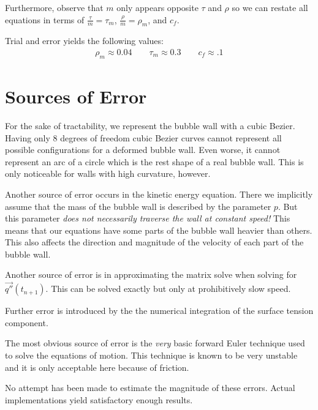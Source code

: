 \documentclass{article}
\begin{document}
Furthermore, observe that $m$ only appears opposite $\tau$ and
$\rho$ so we can restate all equations in terms of $\frac{\tau}{m}=\tau_m$,
$\frac{\rho}{m}=\rho_m$, and $c_f$.

Trial and error yields the following values:
\begin{align*}
\rho_m \approx 0.04 \qquad \tau_m \approx 0.3 \qquad c_f \approx .1
\end{align*}\clearpage
\section{Sources of Error}
For the sake of tractability, we represent the bubble wall with a
cubic Bezier. Having only 8 degrees of freedom cubic Bezier curves cannot
represent all possible configurations for a deformed bubble wall. Even
worse, it cannot represent an arc of a circle which is the rest shape of a real
bubble wall. This is only noticeable for walls with high curvature, however.

Another source of error occurs in the kinetic energy equation. There we
implicitly assume that the mass of the bubble wall is described by the
parameter $p$. But this parameter \emph{does not necessarily
traverse the wall at constant speed!} This means that our equations have some
parts of the bubble wall heavier than others. This also affects
the direction and magnitude of the velocity of each part of the bubble wall.

Another source of error is in approximating the matrix solve when solving for
$\vec{q''}(t_{n+1})$. This can be solved exactly but only at prohibitively slow
speed.

Further error is introduced by the the numerical integration of the surface
tension component.

The most obvious source of error is the \emph{very} basic forward Euler
technique used to solve the equations of motion. This technique is known to be
very unstable and it is only acceptable here because of friction.

No attempt has been made to estimate the magnitude of these errors. Actual
implementations yield satisfactory enough results.
\end{document}
